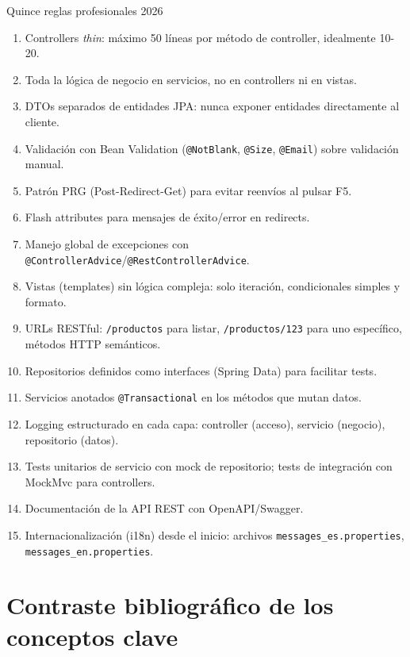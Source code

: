 \documentclass[11pt,a4paper,openany]{book}
\begin{document}
\begin{cajabuenas}{Quince reglas profesionales 2026}
\begin{enumerate}
\item Controllers \emph{thin}: máximo 50 líneas por método de
controller, idealmente 10-20.
\item Toda la lógica de negocio en servicios, no en controllers ni
en vistas.
\item DTOs separados de entidades JPA: nunca exponer entidades
directamente al cliente.
\item Validación con Bean Validation (\texttt{@NotBlank},
\texttt{@Size}, \texttt{@Email}) sobre validación manual.
\item Patrón PRG (Post-Redirect-Get) para evitar reenvíos al pulsar
F5.
\item Flash attributes para mensajes de éxito/error en redirects.
\item Manejo global de excepciones con
\texttt{@ControllerAdvice}/\texttt{@RestControllerAdvice}.
\item Vistas (templates) sin lógica compleja: solo iteración,
condicionales simples y formato.
\item URLs RESTful: \texttt{/productos} para listar, \texttt{/productos/123}
para uno específico, métodos HTTP semánticos.
\item Repositorios definidos como interfaces (Spring Data) para
facilitar tests.
\item Servicios anotados \texttt{@Transactional} en los métodos que
mutan datos.
\item Logging estructurado en cada capa: controller (acceso),
servicio (negocio), repositorio (datos).
\item Tests unitarios de servicio con mock de repositorio; tests de
integración con MockMvc para controllers.
\item Documentación de la API REST con OpenAPI/Swagger.
\item Internacionalización (i18n) desde el inicio: archivos
\texttt{messages\_es.properties}, \texttt{messages\_en.properties}.
\end{enumerate}
\end{cajabuenas}

\section{Contraste bibliográfico de los conceptos clave}
\end{document}
